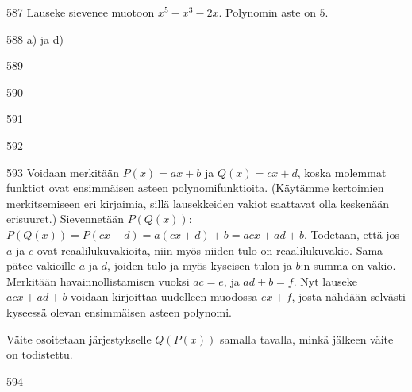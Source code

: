 \begin{Vastaus}{587}
        Lauseke sievenee muotoon $x^5-x^3-2x$. Polynomin aste on $5$.
    
\end{Vastaus}
\begin{Vastaus}{588}
		a) ja d)
	
\end{Vastaus}
\begin{Vastaus}{589}
	
\end{Vastaus}
\begin{Vastaus}{590}
    
\end{Vastaus}
\begin{Vastaus}{591}
    
\end{Vastaus}
\begin{Vastaus}{592}
    
\end{Vastaus}
\begin{Vastaus}{593}
Voidaan merkitään $P(x)=ax+b$ ja $Q(x)=cx+d$, koska molemmat funktiot ovat ensimmäisen asteen polynomifunktioita. (Käytämme kertoimien merkitsemiseen eri kirjaimia, sillä lausekkeiden vakiot saattavat olla keskenään erisuuret.) Sievennetään $P(Q(x))$: $P(Q(x))=P(cx+d)=a(cx+d)+b=acx+ad+b$. Todetaan, että jos $a$ ja $c$ ovat reaalilukuvakioita, niin myös niiden tulo on reaalilukuvakio. Sama pätee vakioille $a$ ja $d$, joiden tulo ja myös kyseisen tulon ja $b$:n summa on vakio. Merkitään havainnollistamisen vuoksi $ac=e$, ja $ad+b=f$. Nyt lauseke $acx+ad+b$ voidaan kirjoittaa uudelleen muodossa $ex+f$, josta nähdään selvästi kyseessä olevan ensimmäisen asteen polynomi.

Väite osoitetaan järjestykselle $Q(P(x))$ samalla tavalla, minkä jälkeen väite on todistettu.

	
\end{Vastaus}
\begin{Vastaus}{594}
	
\end{Vastaus}

